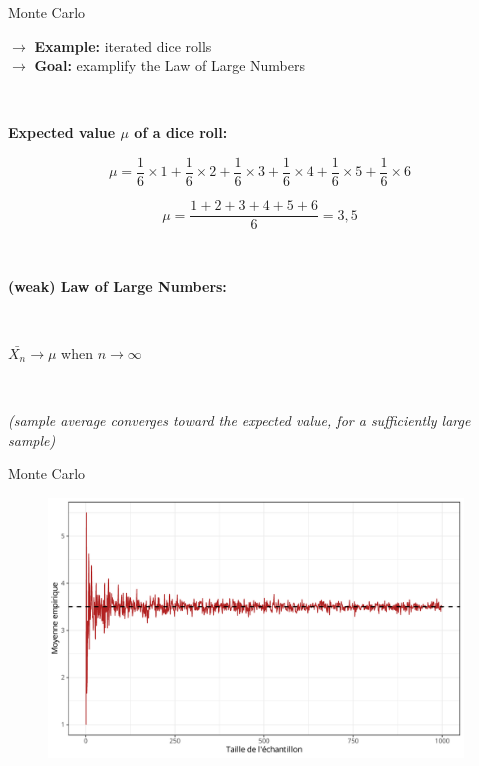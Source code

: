 \begin{frame}{Monte Carlo}

$\rightarrow$ \textbf{Example:} iterated dice rolls \\
$\rightarrow$ \textbf{Goal:} examplify the Law of Large Numbers

~

\textbf{Expected value $\mu$ of a dice roll:}

$$
\mu = \frac{1}{6} \times 1 + \frac{1}{6} \times 2 + \frac{1}{6} \times 3 + \frac{1}{6} \times 4 + \frac{1}{6} \times 5 + \frac{1}{6} \times 6
$$


$$
\mu = \frac{1+2+3+4+5+6}{6} = 3,5
$$

~

\textbf{(weak) Law of Large Numbers: }

~
\begin{center}
$\bar{X_n} \to \mu$ when $n \to \infty$
\end{center}

~

\emph{(sample average converges toward the expected value, for a sufficiently large sample)}

\end{frame}


\begin{frame}{Monte Carlo}
\begin{figure}
\includegraphics[width=11cm]{TirageDe.pdf}
\end{figure}

\end{frame}



